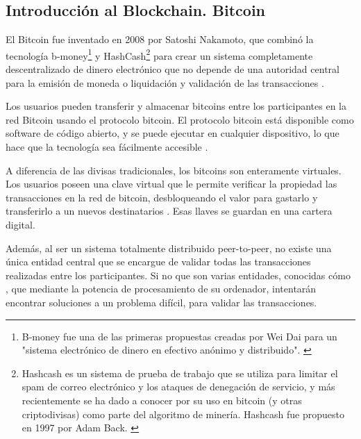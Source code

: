 \newpage

\subsection{Introducción al Blockchain. Bitcoin}

El Bitcoin fue inventado en 2008 por Satoshi Nakamoto, que combinó la tecnología b-money\footnote{B-money 
fue una de las primeras propuestas creadas por Wei Dai para un "sistema electrónico de dinero en efectivo anónimo y 
distribuido". \label{fnlabel}} y HashCash\footnote{Hashcash es un sistema de prueba de trabajo que se utiliza para 
limitar el spam de correo electrónico y los ataques de denegación de servicio, y más recientemente se ha dado a 
conocer por su uso en bitcoin (y otras criptodivisas) como parte del algoritmo de minería. Hashcash fue propuesto 
en 1997 por Adam Back. \label{fnlabel}} para crear un sistema completamente descentralizado de dinero  electrónico 
que no depende de una autoridad central para la emisión de moneda o liquidación y validación de las transacciones 
\cite{antonopoulos2014mastering, bmoney, hashcash}.

\vspace{5mm}

\noindent Los usuarios pueden transferir y almacenar bitcoins entre los participantes en la red Bitcoin usando el 
protocolo bitcoin. El protocolo bitcoin está disponible como software de código abierto, y se puede ejecutar en 
cualquier dispositivo, lo que hace que la tecnología sea fácilmente accesible \cite{antonopoulos2014mastering}.

\vspace{5mm}

\noindent A diferencia de las divisas tradicionales, los bitcoins son enteramente virtuales. Los usuarios poseen una 
clave virtual que le permite verificar la propiedad las transacciones en la red de bitcoin, desbloqueando el valor para 
gastarlo y transferirlo a un nuevos destinatarios \cite{antonopoulos2014mastering}. Esas llaves se guardan en una 
cartera digital. 

\vspace{5mm}

\noindent Además, al ser un sistema totalmente distribuido peer-to-peer, no existe una única entidad central que se 
encargue de validar todas las transacciones realizadas entre los participantes. Si no que son varias entidades, 
conocidas cómo , que mediante la potencia de procesamiento de su ordenador, intentarán encontrar 
soluciones a un problema difícil, para validar las transacciones.

